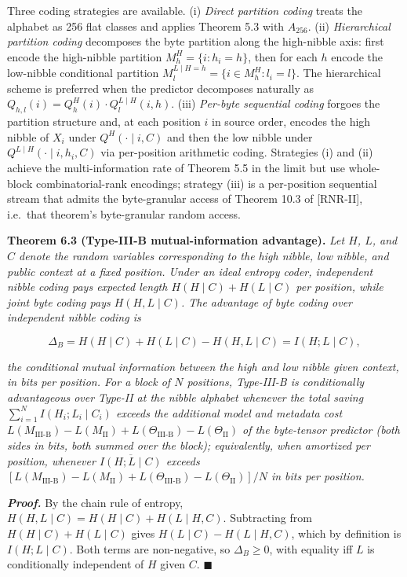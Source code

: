 \documentclass[
]{article}
\begin{document}
Three coding strategies are available. (i) \emph{Direct partition
coding} treats the alphabet as 256 flat classes and applies
Theorem 5.3 with $A_{256}$. (ii) \emph{Hierarchical partition
coding} decomposes the byte partition along the high-nibble axis:
first encode the high-nibble partition
$M^H_h = \{ i : h_i = h \}$, then for each $h$ encode the
low-nibble conditional partition
$M^{L \mid H = h}_l = \{ i \in M^H_h : l_i = l \}$. The
hierarchical scheme is preferred when the predictor decomposes
naturally as
$Q_{h,l}(i) = Q^H_h(i) \cdot Q^{L \mid H}_l(i, h)$. (iii)
\emph{Per-byte sequential coding} forgoes the partition structure
and, at each position $i$ in source order, encodes the high
nibble of $X_i$ under $Q^H(\cdot \mid i, C)$ and then the low
nibble under $Q^{L \mid H}(\cdot \mid i, h_i, C)$ via per-position
arithmetic coding. Strategies (i) and (ii) achieve the
multi-information rate of Theorem 5.5 in the limit but use
whole-block combinatorial-rank encodings; strategy (iii) is a
per-position sequential stream that admits the byte-granular access of Theorem 10.3 of [RNR-II], i.e.\ that theorem's
byte-granular random access.

\textbf{Theorem 6.3 (Type-III-B mutual-information advantage).}
\emph{Let $H$, $L$, and $C$ denote the random variables corresponding
to the high nibble, low nibble, and public context at a fixed
position. Under an ideal entropy coder, independent nibble coding pays
expected length $H(H \mid C) + H(L \mid C)$ per position, while joint
byte coding pays $H(H, L \mid C)$. The advantage of byte coding over
independent nibble coding is}

\[
\Delta_B = H(H \mid C) + H(L \mid C) - H(H, L \mid C) = I(H ; L \mid C),
\tag{6.2}
\]

\emph{the conditional mutual information between the high and low
nibble given context, in bits per position. For a block of $N$
positions, Type-III-B is conditionally advantageous over Type-II at
the nibble alphabet whenever the total saving
$\sum_{i=1}^{N} I(H_i ; L_i \mid C_i)$ exceeds the additional model
and metadata cost
$L(M_{\mathrm{III\text{-}B}}) - L(M_{\mathrm{II}}) + L(\Theta_{\mathrm{III\text{-}B}}) - L(\Theta_{\mathrm{II}})$
of the byte-tensor predictor (both sides in bits, both summed over
the block); equivalently, when amortized per position, whenever
$\overline{I(H;L \mid C)}$ exceeds
$[L(M_{\mathrm{III\text{-}B}}) - L(M_{\mathrm{II}}) + L(\Theta_{\mathrm{III\text{-}B}}) - L(\Theta_{\mathrm{II}})] / N$
in bits per position.}

\emph{\textbf{Proof.}} By the chain rule of entropy,
$H(H, L \mid C) = H(H \mid C) + H(L \mid H, C)$. Subtracting from
$H(H \mid C) + H(L \mid C)$ gives $H(L \mid C) - H(L \mid H, C)$,
which by definition is $I(H ; L \mid C)$. Both terms are non-negative,
so $\Delta_B \geq 0$, with equality iff $L$ is conditionally
independent of $H$ given $C$. \hfill$\blacksquare$
\end{document}
